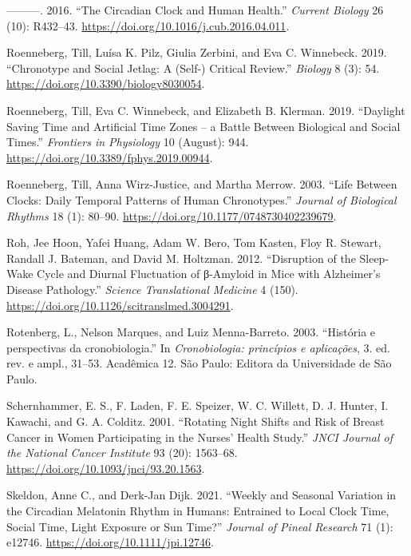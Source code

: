 \documentclass[
  12pt,
  a4paper,
  oneside]{tesesusp}
\newlength{\cslhangindent}
\newlength{\cslentryspacingunit} %
\newenvironment{CSLReferences}[2] %
 {%
  \setlength{\parindent}{0pt}
  \ifodd #1
  \let\oldpar\par
  \def\par{\hangindent=\cslhangindent\oldpar}
  \fi
  \setlength{\parskip}{#2\cslentryspacingunit}
 }%
 {}
\begin{document}
\begin{CSLReferences}{1}{0}
\leavevmode{}%
---------. 2016. {``The Circadian Clock and Human Health.''}
\emph{Current Biology} 26 (10): R432--43.
\url{https://doi.org/10.1016/j.cub.2016.04.011}.

\leavevmode{}%
Roenneberg, Till, Luísa K. Pilz, Giulia Zerbini, and Eva C. Winnebeck.
2019. {``Chronotype and Social Jetlag: A (Self-) Critical Review.''}
\emph{Biology} 8 (3): 54. \url{https://doi.org/10.3390/biology8030054}.

\leavevmode{}%
Roenneberg, Till, Eva C. Winnebeck, and Elizabeth B. Klerman. 2019.
{``Daylight Saving Time and Artificial Time Zones -- a Battle Between
Biological and Social Times.''} \emph{Frontiers in Physiology} 10
(August): 944. \url{https://doi.org/10.3389/fphys.2019.00944}.

\leavevmode{}%
Roenneberg, Till, Anna Wirz-Justice, and Martha Merrow. 2003. {``Life
Between Clocks: Daily Temporal Patterns of Human Chronotypes.''}
\emph{Journal of Biological Rhythms} 18 (1): 80--90.
\url{https://doi.org/10.1177/0748730402239679}.

\leavevmode{}%
Roh, Jee Hoon, Yafei Huang, Adam W. Bero, Tom Kasten, Floy R. Stewart,
Randall J. Bateman, and David M. Holtzman. 2012. {``Disruption of the
Sleep-Wake Cycle and Diurnal Fluctuation of β-Amyloid in Mice with
Alzheimer's Disease Pathology.''} \emph{Science Translational Medicine}
4 (150). \url{https://doi.org/10.1126/scitranslmed.3004291}.

\leavevmode{}%
Rotenberg, L., Nelson Marques, and Luiz Menna-Barreto. 2003. {``História
e perspectivas da cronobiologia.''} In \emph{Cronobiologia: princípios e
aplicações}, 3. ed. rev. e ampl., 31--53. Acadêmica 12. São Paulo:
Editora da Universidade de São Paulo.

\leavevmode{}%
Schernhammer, E. S., F. Laden, F. E. Speizer, W. C. Willett, D. J.
Hunter, I. Kawachi, and G. A. Colditz. 2001. {``Rotating Night Shifts
and Risk of Breast Cancer in Women Participating in the Nurses' Health
Study.''} \emph{JNCI Journal of the National Cancer Institute} 93 (20):
1563--68. \url{https://doi.org/10.1093/jnci/93.20.1563}.

\leavevmode{}%
Skeldon, Anne C., and Derk‐Jan Dijk. 2021. {``Weekly and Seasonal
Variation in the Circadian Melatonin Rhythm in Humans: Entrained to
Local Clock Time, Social Time, Light Exposure or Sun Time?''}
\emph{Journal of Pineal Research} 71 (1): e12746.
\url{https://doi.org/10.1111/jpi.12746}.


\end{CSLReferences}
\end{document}
